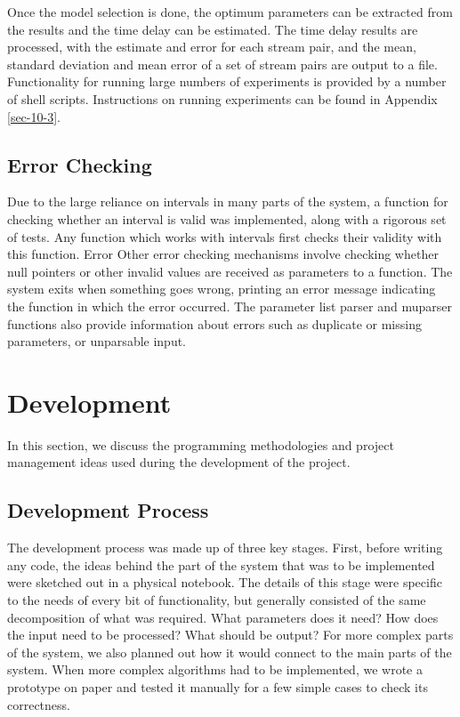 \documentclass[a4paper,11pt]{article}
\begin{document}
   Once the model selection is done, the optimum parameters can be extracted
   from the results and the time delay can be estimated. The time delay results
   are processed, with the estimate and error for each stream pair, and the
   mean, standard deviation and mean error of a set of stream pairs are output
   to a file. Functionality for running large numbers of experiments is provided
   by a number of shell scripts. Instructions on running experiments can be
   found in Appendix \ref{sec-10-3}.
\subsection{Error Checking}
\label{sec-6-10}

   Due to the large reliance on intervals in many parts of the system, a
   function for checking whether an interval is valid was implemented, along
   with a rigorous set of tests. Any function which works with intervals first
   checks their validity with this function. Error Other error checking
   mechanisms involve checking whether null pointers or other invalid values are
   received as parameters to a function. The system exits when something goes
   wrong, printing an error message indicating the function in which the error
   occurred. The parameter list parser and muparser functions also provide
   information about errors such as duplicate or missing parameters, or
   unparsable input.
\section{Development}
\label{sec-7}

  In this section, we discuss the programming methodologies and project management
  ideas used during the development of the project.
\subsection{Development Process}
\label{sec-7-1}

   The development process was made up of three key stages. First, before
   writing any code, the ideas behind the part of the system that was to be
   implemented were sketched out in a physical notebook. The details of this
   stage were specific to the needs of every bit of functionality, but generally
   consisted of the same decomposition of what was required. What parameters
   does it need? How does the input need to be processed? What should be output?
   For more complex parts of the system, we also planned out how it would
   connect to the main parts of the system. When more complex algorithms had to
   be implemented, we wrote a prototype on paper and tested it manually for a
   few simple cases to check its correctness.
\end{document}
